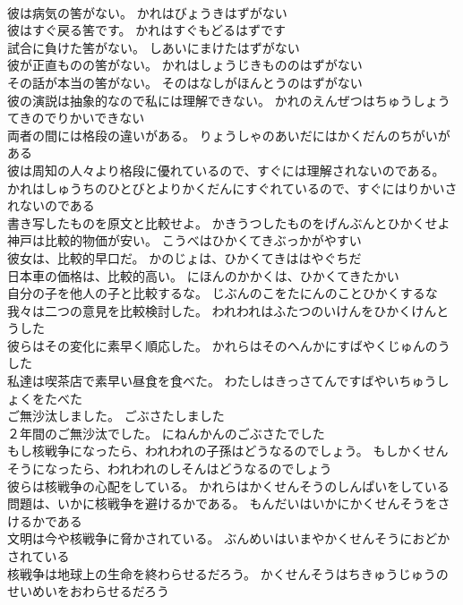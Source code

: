 \documentclass[8pt]{extreport}
\begin{document}
\begin{CJK}{UTF8}{min}
\\	彼は病気の筈がない。	かれはびょうきはずがない 
\\	彼はすぐ戻る筈です。	かれはすぐもどるはずです 
\\	試合に負けた筈がない。	しあいにまけたはずがない 
\\	彼が正直ものの筈がない。	かれはしょうじきもののはずがない 
\\	その話が本当の筈がない。	そのはなしがほんとうのはずがない 
\\	彼の演説は抽象的なので私には理解できない。	かれのえんぜつはちゅうしょうてきのでりかいできない 
\\	両者の間には格段の違いがある。	りょうしゃのあいだにはかくだんのちがいがある 
\\	彼は周知の人々より格段に優れているので、すぐには理解されないのである。	かれはしゅうちのひとびとよりかくだんにすぐれているので、すぐにはりかいされないのである 
\\	書き写したものを原文と比較せよ。	かきうつしたものをげんぶんとひかくせよ 
\\	神戸は比較的物価が安い。	こうべはひかくてきぶっかがやすい 
\\	彼女は、比較的早口だ。	かのじょは、ひかくてきははやぐちだ 
\\	日本車の価格は、比較的高い。	にほんのかかくは、ひかくてきたかい 
\\	自分の子を他人の子と比較するな。	じぶんのこをたにんのことひかくするな 
\\	我々は二つの意見を比較検討した。	われわれはふたつのいけんをひかくけんとうした 
\\	彼らはその変化に素早く順応した。	かれらはそのへんかにすばやくじゅんのうした 
\\	私達は喫茶店で素早い昼食を食べた。	わたしはきっさてんですばやいちゅうしょくをたべた 
\\	ご無沙汰しました。	ごぶさたしました 
\\	２年間のご無沙汰でした。	にねんかんのごぶさたでした 
\\	もし核戦争になったら、われわれの子孫はどうなるのでしょう。	もしかくせんそうになったら、われわれのしそんはどうなるのでしょう 
\\	彼らは核戦争の心配をしている。	かれらはかくせんそうのしんぱいをしている 
\\	問題は、いかに核戦争を避けるかである。	もんだいはいかにかくせんそうをさけるかである 
\\	文明は今や核戦争に脅かされている。	ぶんめいはいまやかくせんそうにおどかされている 
\\	核戦争は地球上の生命を終わらせるだろう。	かくせんそうはちきゅうじゅうのせいめいをおわらせるだろう 

\end{CJK}
\end{document}
